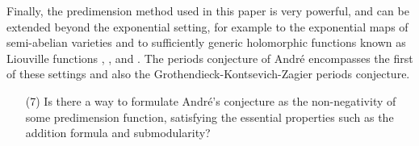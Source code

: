 \documentclass[12pt]{amsart}
\theoremstyle{definition}
\begin{document}
Finally, the predimension method used in this paper is very powerful, and can be extended beyond the exponential setting, for example to the exponential maps of semi-abelian varieties \cite{TEDESV} and to sufficiently generic holomorphic functions known as Liouville functions \cite{Zilber02tgfd}, \cite{Wilkie05}, and \cite{Koiran03}. The periods conjecture of Andr\'e encompasses the first of these settings and also the Grothendieck-Kontsevich-Zagier periods conjecture.

\begin{enumerate}
  \item[(7)] Is there a way to formulate Andr\'e's conjecture as the non-negativity of some predimension function, satisfying the essential properties such as the addition formula and submodularity?
\end{enumerate}
\end{document}
